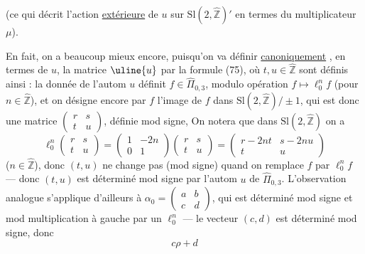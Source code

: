 
(ce qui décrit l'action \uline{extérieure} de $u$ sur
$\mathrm{Sl}(2,\widehat{\mathbb Z})'$ en termes du multiplicateur $\mu$).


En fait, on a beaucoup mieux encore,
puisqu'on va définir \uline{canoniquement}
,
en termes de $u$, la matrice $\uline{u}$ par la
formule (75), où  $t,u\in\widehat{\mathbb Z}$ sont
définis ainsi :  la donnée de l'autom $u$
définit $f\in\widehat{\Pi}_{0,3}$, modulo opération $f\mapsto\ell_0^n f$
(pour $n\in\widehat{\mathbb Z}$), et on désigne encore par $f$
l'image de $f$ dans $\mathrm{Sl}(2,\widehat{\mathbb Z})/\pm1$, qui est donc
une matrice $\begin{pmatrix}r&s\\t&u\end{pmatrix}$, définie mod signe,
On notera que dans $\mathrm{Sl}(2,\widehat{\mathbb Z})$ on a
\[
\ell_0^n\begin{pmatrix}r&s\\t&u\end{pmatrix}
=\begin{pmatrix}1&-2n\\0&1\end{pmatrix}
\begin{pmatrix}r&s\\t&u\end{pmatrix}
=\begin{pmatrix}r-2nt&s-2nu\\t&u\end{pmatrix}
\tag{79}
\]
($n\in\widehat{\mathbb Z}$), donc $(t,u)$ ne change pas (mod signe)
quand on remplace $f$ par $\ell_0^n f$ --- donc $(t,u)$
est déterminé mod signe par l'autom $u$
de $\widehat{\Pi}_{0,3}$.  L'observation analogue s'applique
d'ailleurs à $\alpha_0=\begin{pmatrix}a&b\\c&d\end{pmatrix}$, qui est déterminé
mod signe et mod multiplication à gauche
par un $\ell_0^n$ --- le  vecteur $(c,d)$ est
déterminé mod signe, donc 
\[
c\rho+d
\]

